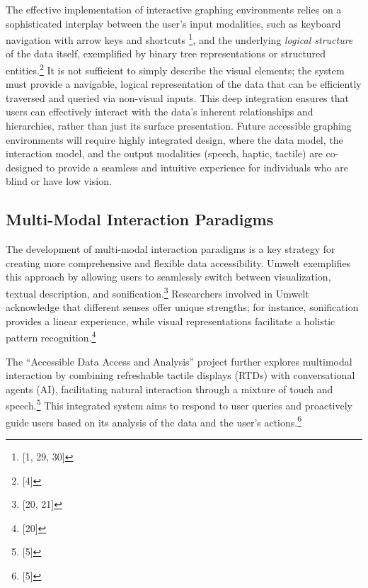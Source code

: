 The effective implementation of interactive graphing environments relies on a sophisticated interplay between the user's input modalities, such as keyboard navigation with arrow keys and shortcuts \footnote{[1, 29, 30]}, and the underlying \textit{logical structure} of the data itself, exemplified by binary tree representations or structured entities.\footnote{[4]} It is not sufficient to simply describe the visual elements; the system must provide a navigable, logical representation of the data that can be efficiently traversed and queried via non-visual inputs. This deep integration ensures that users can effectively interact with the data's inherent relationships and hierarchies, rather than just its surface presentation. Future accessible graphing environments will require highly integrated design, where the data model, the interaction model, and the output modalities (speech, haptic, tactile) are co-designed to provide a seamless and intuitive experience for individuals who are blind or have low vision.

\subsection{Multi-Modal Interaction Paradigms}
The development of multi-modal interaction paradigms is a key strategy for creating more comprehensive and flexible data accessibility. Umwelt exemplifies this approach by allowing users to seamlessly switch between visualization, textual description, and sonification.\footnote{[20, 21]} Researchers involved in Umwelt acknowledge that different senses offer unique strengths; for instance, sonification provides a linear experience, while visual representations facilitate a holistic pattern recognition.\footnote{[20]}

The ``Accessible Data Access and Analysis'' project further explores multimodal interaction by combining refreshable tactile displays (RTDs) with conversational agents (AI), facilitating natural interaction through a mixture of touch and speech.\footnote{[5]} This integrated system aims to respond to user queries and proactively guide users based on its analysis of the data and the user's actions.\footnote{[5]}

